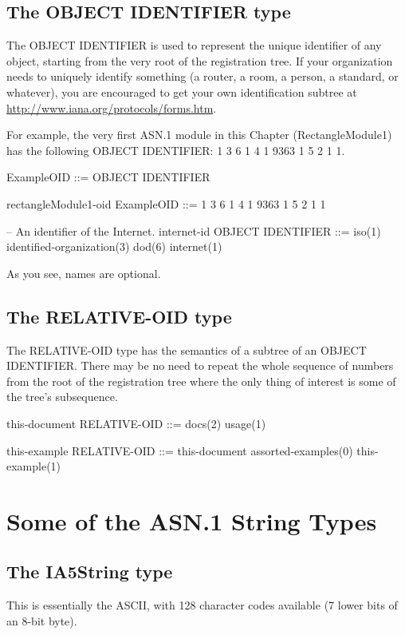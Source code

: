 \documentclass[english,oneside,12pt]{book}
\begin{document}
\subsection{The OBJECT IDENTIFIER type}

The OBJECT IDENTIFIER is used to represent the unique identifier of
any object, starting from the very root of the registration tree.
If your organization needs to uniquely identify something (a router,
a room, a person, a standard, or whatever), you are encouraged to
get your own identification subtree at \url{http://www.iana.org/protocols/forms.htm}.

For example, the very first ASN.1 module in this Chapter (RectangleModule1)
has the following OBJECT IDENTIFIER: 1 3 6 1 4 1 9363 1 5 2 1 1.
\begin{asn}
ExampleOID ::= OBJECT IDENTIFIER

rectangleModule1-oid ExampleOID
  ::= { 1 3 6 1 4 1 9363 1 5 2 1 1 }

-- An identifier of the Internet.
internet-id OBJECT IDENTIFIER
  ::= { iso(1) identified-organization(3)
        dod(6) internet(1) }
\end{asn}
As you see, names are optional.


\subsection{The RELATIVE-OID type}

The RELATIVE-OID type has the semantics of a subtree of an OBJECT
IDENTIFIER. There may be no need to repeat the whole sequence of numbers
from the root of the registration tree where the only thing of interest
is some of the tree's subsequence.
\begin{asn}
this-document RELATIVE-OID ::= { docs(2) usage(1) }

this-example RELATIVE-OID ::= {
    this-document assorted-examples(0) this-example(1) }
\end{asn}

\section{Some of the ASN.1 String Types}


\subsection{The IA5String type}

This is essentially the ASCII, with 128 character codes available
(7 lower bits of an 8-bit byte).
\end{document}
